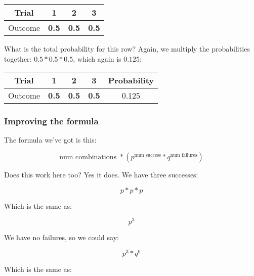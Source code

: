 \documentclass[../../../main.tex]{subfiles}
\begin{document}
\begin{center}
  \begin{tabular}{| c | c | c | c |}
    \hline
      \textbf{Trial} & \textbf{1} & \textbf{2} & \textbf{3} \\ \hline
  Outcome & \textbf{0.5} & \textbf{0.5} & \textbf{0.5} \\ \hline
  \end{tabular}
\end{center}

\noindent
What is the total probability for this row? Again, we multiply the probabilities together: $0.5 * 0.5 * 0.5$, which again is $0.125$:

\begin{center}
  \begin{tabular}{| c | c | c | c | c |}
    \hline
      \textbf{Trial} & \textbf{1} & \textbf{2} & \textbf{3} & \textbf{Probability} \\ \hline
  Outcome & \textbf{0.5} & \textbf{0.5} & \textbf{0.5} & 0.125 \\ \hline
  \end{tabular}
\end{center}

\subsubsection{Improving the formula}

The formula we've got is this:

\begin{equation*}
    \text{num combinations } * (p^{\text{num success}} * q^{\text{num failures}})
\end{equation*}

Does this work here too? Yes it does. We have three successes:

\begin{equation*}
    p * p * p
\end{equation*}

Which is the same as:

\begin{equation*}
    p^{3}
\end{equation*}

We have no failures, so we could say:

\begin{equation*}
    p^{3} * q^{0}
\end{equation*}

Which is the same as:
\end{document}
